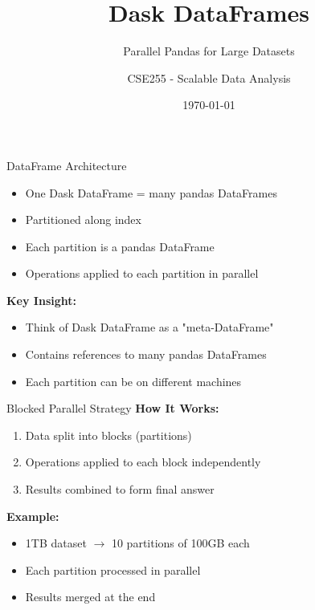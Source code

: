 \documentclass[aspectratio=169]{beamer}
\title{Dask DataFrames}
\subtitle{Parallel Pandas for Large Datasets}
\author{CSE255 - Scalable Data Analysis}
\date{\today}
\begin{document}
\frame{\titlepage}

\begin{frame}{DataFrame Architecture}
\small
\begin{itemize}
    \item One Dask DataFrame = many pandas DataFrames
    \item Partitioned along index
    \item Each partition is a pandas DataFrame
    \item Operations applied to each partition in parallel
\end{itemize}

\vspace{0.1cm}
\textbf{Key Insight:}
\begin{itemize}
    \item Think of Dask DataFrame as a "meta-DataFrame"
    \item Contains references to many pandas DataFrames
    \item Each partition can be on different machines
\end{itemize}
\end{frame}

\begin{frame}[fragile]{Blocked Parallel Strategy}
\small
\textbf{How It Works:}
\begin{enumerate}
    \item Data split into blocks (partitions)
    \item Operations applied to each block independently
    \item Results combined to form final answer
\end{enumerate}

\vspace{0.15cm}
\textbf{Example:}
\begin{itemize}
    \item 1TB dataset $\rightarrow$ 10 partitions of 100GB each
    \item Each partition processed in parallel
    \item Results merged at the end
\end{itemize}
\end{frame}
\end{document}
